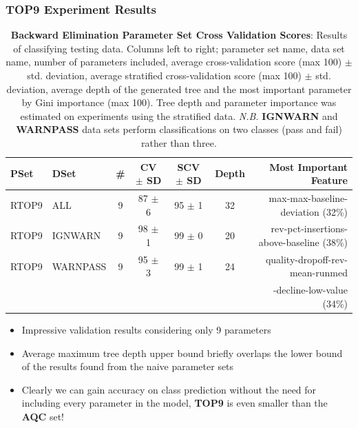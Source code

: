 \documentclass{beamer}
\begin{document}
\begin{frame}[t]
\frametitle{TOP9 Experiment Results}
    \begin{table}
        \centering
        \tiny
        \begin{tabular}{l l | c  c  c  c  r}
            PSet & DSet          & \# & CV $±$ SD & SCV $±$ SD & Depth & Most Important Feature\\
            \hline
            RTOP9 & ALL         & 9  & 87 $±$ 6  & 95 $±$ 1 & 32 & max-max-baseline-deviation (32\%)\\
            RTOP9 & IGNWARN     & 9  & 98 $±$ 1  & 99 $±$ 0 & 20 & rev-pct-insertions-above-baseline (38\%)\\
            RTOP9 & WARNPASS    & 9 & 95 $±$ 3 & 99 $±$ 1 & 24 &
                                                        quality-dropoff-rev-mean-runmed\\
                                                        &&&&&&-decline-low-value (34\%)\\
        \end{tabular}

        \caption[be-pset-cv]{\tiny{\textbf{Backward Elimination Parameter Set Cross Validation Scores}:
            Results of classifying testing data.
            Columns left to right; parameter set name, data set name, number of parameters
            included, average cross-validation score (max 100) $±$ std. deviation,
            average stratified cross-validation score (max 100) $±$ std. deviation,
            average depth of the generated tree and the most important parameter by
            Gini importance (max 100). Tree depth and parameter importance was
            estimated on experiments using the stratified data. \textit{N.B.}
            \textbf{IGNWARN} and \textbf{WARNPASS} data sets perform classifications on
            two classes (pass and fail) rather than three.}}
    \end{table}
    \begin{itemize}
        \item Impressive validation results considering only 9 parameters
        \item Average maximum tree depth upper bound briefly overlaps the lower bound
            of the results found from the naive parameter sets
        \item Clearly we can gain accuracy on class prediction without the need for
            including every parameter in the model, \textbf{TOP9} is even smaller than the
            \textbf{AQC} set!
    \end{itemize}
\end{frame}
\end{document}

